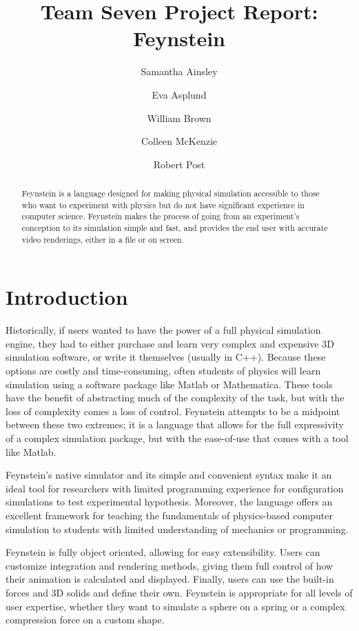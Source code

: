 \documentclass[letterpaper]{article}
\title{Team Seven Project Report: Feynstein}
\author{Samantha Ainsley \and Eva Asplund \and William Brown \and
  Colleen McKenzie \and Robert Post}
\begin{document}
\maketitle

\begin{abstract}
  Feynstein is a language designed for making physical simulation accessible to
  those who want to experiment with physics but do not have significant
  experience in computer science. Feynstein makes the process of going from an
  experiment's conception to its simulation simple and fast, and provides the
  end user with accurate video renderings, either in a file or on screen.
\end{abstract}

\tableofcontents

\section{Introduction}

Historically, if users wanted to have the power of a full physical simulation
engine, they had to either purchase and learn very complex and expensive 3D
simulation software, or write it themselves (usually in C++). Because these
options are costly and time-consuming, often students of physics will learn
simulation using a software package like Matlab or Mathematica. These tools have
the benefit of abstracting much of the complexity of the task, but with the loss
of complexity comes a loss of control. Feynstein attempts to be a midpoint
between these two extremes; it is a language that allows for the full
expressivity of a complex simulation package, but with the ease-of-use that
comes with a tool like Matlab.

Feynstein's native simulator and its simple and convenient syntax make it an
ideal tool for researchers with limited programming experience for configuration
simulations to test experimental hypothesis. Moreover, the language offers an
excellent framework for teaching the fundamentals of physics-based computer
simulation to students with limited understanding of mechanics or programming.

Feynstein is fully object oriented, allowing for easy extensibility. Users can
customize integration and rendering methods, giving them full control of how
their animation is calculated and displayed. Finally, users can use the built-in
forces and 3D solids and define their own. Feynstein is appropriate for all
levels of user expertise, whether they want to simulate a sphere on a spring or
a complex compression force on a custom shape.
\end{document}
